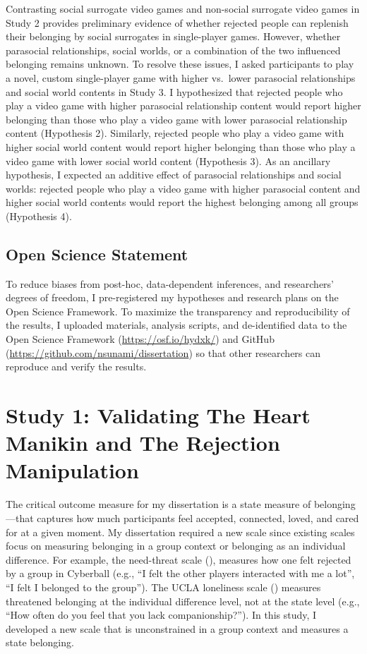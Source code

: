 \documentclass[
]{udthesis}
\begin{document}
Contrasting social surrogate video games and non-social surrogate video
games in Study 2 provides preliminary evidence of whether rejected
people can replenish their belonging by social surrogates in
single-player games. However, whether parasocial relationships, social
worlds, or a combination of the two influenced belonging remains
unknown. To resolve these issues, I asked participants to play a novel,
custom single-player game with higher vs.~lower parasocial relationships
and social world contents in Study 3. I hypothesized that rejected
people who play a video game with higher parasocial relationship content
would report higher belonging than those who play a video game with
lower parasocial relationship content (Hypothesis 2). Similarly,
rejected people who play a video game with higher social world content
would report higher belonging than those who play a video game with
lower social world content (Hypothesis 3). As an ancillary hypothesis, I
expected an additive effect of parasocial relationships and social
worlds: rejected people who play a video game with higher parasocial
content and higher social world contents would report the highest
belonging among all groups (Hypothesis 4).

\section{Open Science Statement}\label{open-science-statement}

To reduce biases from post-hoc, data-dependent inferences, and
researchers' degrees of freedom, I pre-registered my hypotheses and
research plans on the Open Science Framework. To maximize the
transparency and reproducibility of the results, I uploaded materials,
analysis scripts, and de-identified data to the Open Science Framework
(\url{https://osf.io/hydxk/}) and GitHub
(\url{https://github.com/nsunami/dissertation}) so that other researchers
can reproduce and verify the results.

\chapter{Study 1: Validating The Heart Manikin and The Rejection Manipulation}\label{study-1-validating-the-heart-manikin-and-the-rejection-manipulation}

The critical outcome measure for my dissertation is a state measure of
belonging---that captures how much participants feel accepted,
connected, loved, and cared for at a given moment. My dissertation
required a new scale since existing scales focus on measuring belonging
in a group context or belonging as an individual difference. For
example, the need-threat scale (), measures how one felt
rejected by a group in Cyberball (e.g., ``I felt the other players
interacted with me a lot'', ``I felt I belonged to the group''). The UCLA
loneliness scale () measures threatened belonging at the
individual difference level, not at the state level (e.g., ``How often do
you feel that you lack companionship?''). In this study, I developed a new scale
that is unconstrained in a group context and measures a state belonging.
\end{document}
